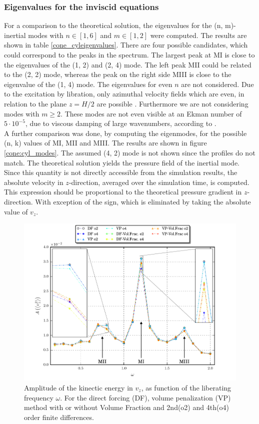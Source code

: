\subsubsection{Eigenvalues for the inviscid equations}

For a comparison to the theoretical solution, the eigenvalues for the (n, m)-inertial modes with $n\in[1,6]$ and $m\in[1, 2]$ were computed.
The results are shown in table \ref{cone_cyleigenvalues}.
There are four possible candidates,  which could correspond to the peaks in the spectrum.
The largest peak at M\RN{1} is close to the eigenvalues of the (1, 2) and (2, 4) mode.
The left peak  M\RN{2} could be related to the (2, 2) mode,  whereas the peak on the right side M\RN{3} is close to the eigenvalue of the (1, 4) mode.
The eigenvalues for even $n$ are not considered. Due to the excitation by libration,  only azimuthal velocity fields which are even,
in relation to the plane $z=H/2$ are possible \citep{Sauret2012}.
Furthermore we are not considering modes with $m\geq2$. These modes are not even visible at an Ekman number of $5\cdot10^{-5}$,
due to viscous damping of large wavenumbers, according to \citep{Sauret2012}.\\
A further comparison was done, by computing the eigenmodes, for the possible (n, k) values of M\RN{1}, M\RN{2} and M\RN{3}.
The results are shown in figure \ref{cone:cyl_modes}.
The assumed (4, 2) mode is not shown since the profiles do not match.
The theoretical solution yields the pressure field of the inertial mode.
Since this quantity is not directly accessible from the simulation results,
the absolute velocity in $z$-direction, averaged over the simulation time, is computed.
This expression should be proportional to the theoretical pressure gradient in $z$-direction.
With exception of the sign, which is eliminated by taking the absolute value of $v_z$.
\clearpage
\begin{figure}[!t]
  \centering
  \includegraphics{gfx/cone/cylinder/cylinder.pdf}  \caption{\label{fig:cone:cyl}
    Amplitude of the kinectic energy in $v_z$, as function of the liberating frequency $\omega$.
   For the direct forcing (DF), volume penalization (VP) method with or without Volume Fraction and
      2nd(o2)  and 4th(o4) order finite differences.}
\end{figure}


